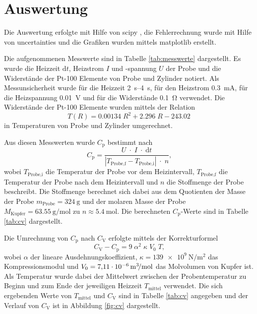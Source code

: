\newpage
\section{Auswertung}
\label{sec:Auswertung}

Die Auswertung erfolgte mit Hilfe von scipy \cite{scipy},
die Fehlerrechnung wurde mit Hilfe von uncertainties \cite{uncertainties}
und die Grafiken wurden mittels matplotlib \cite{matplotlib} erstellt.

Die aufgenommenen Messwerte sind in Tabelle \ref{tab:messwerte}
dargestellt. Es wurde die Heizzeit $\text{d}t$, Heizstrom $I$ und -spannung $U$ der Probe und
die Widerstände der Pt-100 Elemente von Probe und Zylinder notiert. Als Messunsicherheit
wurde für die Heizzeit \SIrange{2}{4}{\second},
für den Heizstrom \SI{0.3}{\milli\ampere},
für die Heizspannung \SI{0.01}{\volt} und
für die Widerstände \SI{0.1}{\ohm} verwendet.
Die Widerstände der Pt-100 Elemente wurden mittels der Relation
\begin{equation}
    T(R) = \num{0.00134}\;R^2 + \num{2.296}\;R - \num{243.02}
    \label{eqn:TausR}
\end{equation}
in Temperaturen von Probe und Zylinder umgerechnet.



Aus diesen Messwerten wurde $C_\text{p}$ bestimmt nach
\begin{equation*}
    C_\text{p} = \frac{U\;\cdot\;I\;\cdot\;\text{d}t}{|T_\text{Probe,f}-T_\text{Probe,i}|\;\cdot\;n}
    \text{,}
\end{equation*}
wobei $T_\text{Probe,i}$ die Temperatur der Probe vor dem Heizintervall, $T_\text{Probe,f}$
die Temperatur der Probe nach dem Heizintervall und $n$ die Stoffmenge der Probe beschreibt.
Die Stoffmenge berechnet sich dabei aus dem Quotienten der Masse der Probe
$m_\text{Probe} = \SI{324}{\gram}$ \cite{anleitung} und der molaren Masse der Probe
$M_\text{Kupfer} = \SI{63.55}{\gram\per\mole}$ \cite{lenntech} zu
$n \approx \SI{5.4}{\mole}$. Die berechneten $C_\text{p}$-Werte sind in Tabelle
\ref{tab:cv} dargestellt.

Die Umrechnung von $C_\text{p}$ nach $C_\text{V}$ erfolgte mittels der Korrekturformel
\begin{equation*}
    C_\text{V} - C_\text{p} = 9\;\alpha^2\;\kappa\;V_0\;T\text{,}
\end{equation*}
wobei $\alpha$ der lineare Ausdehnungskoeffizient,
$\kappa = \SI{139e9}{\newton\per\meter\squared}$ \cite{demtroeder} das Kompressionsmodul
und $V_0 = \SI{7.11e-6}{\raiseto{3}\meter\per\mole}$ \cite{webelements} das Molvolumen
von Kupfer ist. Als Temperatur wurde dabei der Mittelwert zwischen der Probentemperatur
zu Beginn und zum Ende der jeweiligen Heizzeit $T_\text{mittel}$ verwendet.
Die sich ergebenden Werte von $T_\text{mittel}$ und $C_\text{V}$ sind in Tabelle
\ref{tab:cv} angegeben und der Verlauf von $C_\text{V}$ ist in Abbildung
\ref{fig:cv} dargestellt.

